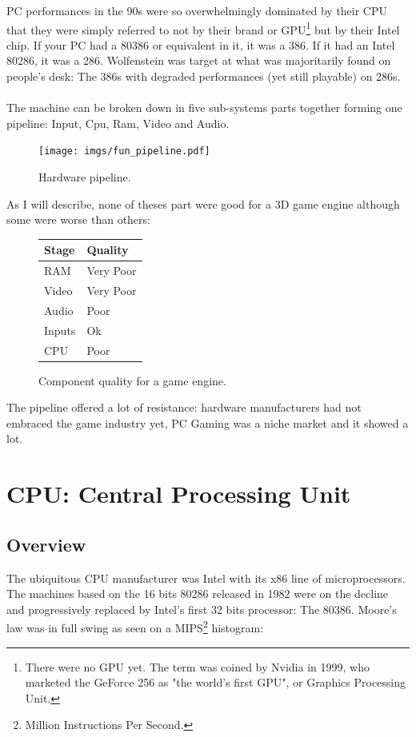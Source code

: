 \documentclass[book.tex]{subfiles}
\begin{document}
PC performances in the 90s were so overwhelmingly dominated by their CPU that they were simply referred to not by their brand or GPU\footnote{There were no GPU yet. The term was coined by Nvidia in 1999, who marketed the GeForce 256 as "the world's first GPU", or Graphics Processing Unit.} but by their Intel chip. If your PC had a 80386 or equivalent in it, it was a 386. If it had an Intel 80286, it was a 286. Wolfenstein was target at what was majoritarily found on people's desk: The 386s with degraded performances (yet still playable) on 286s.\\
\\
The machine can be broken down in five sub-systems parts together forming one pipeline: Input, Cpu, Ram, Video and Audio.\\
 \bigskip
\begin{figure}[H]
\centering
\texttt{[image: imgs/fun\_pipeline.pdf]}
%
\caption{Hardware pipeline.}
\label{fig:digraph}
\end{figure}

As I will describe, none of theses part were good for a 3D game engine although some were worse than others:

 \bigskip

\begin{figure}[H]
\centering
\begin{tabularx}{\textwidth}{ X X  }
  \toprule
  \textbf{Stage} & \textbf{Quality} \\ \bottomrule
  RAM & Very Poor \\ 
  Video & Very Poor \\ 
  Audio & Poor \\ 
  Inputs & Ok \\ 
  CPU & Poor \\ \bottomrule
\end{tabularx}
\caption{Component quality for a game engine.}
\end{figure}

The pipeline offered a lot of resistance: hardware manufacturers had not embraced the game industry yet, PC Gaming was a niche market and it showed a lot.\\

\section{CPU: Central Processing Unit}
  \subsection{Overview}
  The ubiquitous CPU manufacturer was Intel with its x86 line of microprocessors.  The machines based on the 16 bits 80286 released in 1982 were on the decline and progressively replaced by Intel's first 32 bits processor: The 80386. Moore's law was in full swing as seen on a MIPS\footnote{Million Instructions Per Second.} histogram:
\end{document}
